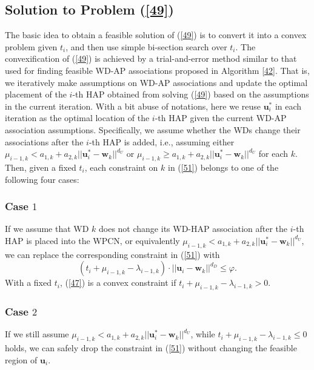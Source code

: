 \documentclass[journal, draftcls, one column, 12pt]{IEEEtran}
\begin{document}
\subsection{Solution to Problem (\ref{49})}
The basic idea to obtain a feasible solution of (\ref{49}) is to convert it into a convex problem given $t_i$, and then use simple bi-section search over $t_i$. The convexification of (\ref{49}) is achieved by a trial-and-error method similar to that used for finding feasible WD-AP associations proposed in Algorithm \ref{42}. That is, we iteratively make assumptions on WD-AP associations and update the optimal placement of the $i$-th HAP obtained from solving (\ref{49}) based on the assumptions in the current iteration. With a bit abuse of notations, here we reuse $\mathbf{u}_i^*$  in each iteration as the optimal location of the $i$-th HAP given the current WD-AP association assumptions. Specifically, we assume whether the WDs change their associations after the $i$-th HAP is added, i.e., assuming either $\mu_{i-1,k}< a_{1,k} + a_{2,k} ||\mathbf{u}_{i}^* - \mathbf{w}_k||^{d_U}$ or $\mu_{i-1,k} \geq a_{1,k} + a_{2,k} ||\mathbf{u}_{i}^* - \mathbf{w}_k||^{d_U}$ for each $k$. Then, given a fixed $t_i$, each constraint on $k$ in (\ref{51}) belongs to one of the following four cases:

\subsubsection{Case $1$}
If we assume that WD $k$ does not change its WD-HAP association after the $i$-th HAP is placed into the WPCN, or equivalently $\mu_{i-1,k}< a_{1,k} + a_{2,k} ||\mathbf{u}_{i}^* - \mathbf{w}_k||^{d_U}$, we can replace the corresponding constraint in (\ref{51}) with
\begin{equation}
\label{47}
\left(t_i+ \mu_{i-1,k} - \lambda_{i-1,k}\right)\cdot||\mathbf{u}_i - \mathbf{w}_k||^{d_D} \leq \varphi.
\end{equation}
With a fixed $t_i$, (\ref{47}) is a convex constraint if $t_i+ \mu_{i-1,k} - \lambda_{i-1,k} > 0$.

\subsubsection{Case $2$} If we still assume $\mu_{i-1,k}< a_{1,k} + a_{2,k} ||\mathbf{u}_{i}^* - \mathbf{w}_k||^{d_U}$, while $t_i+ \mu_{i-1,k} - \lambda_{i-1,k} \leq 0$ holds, we can safely drop the constraint in (\ref{51}) without changing the feasible region of $\mathbf{u}_i$.
\end{document}
